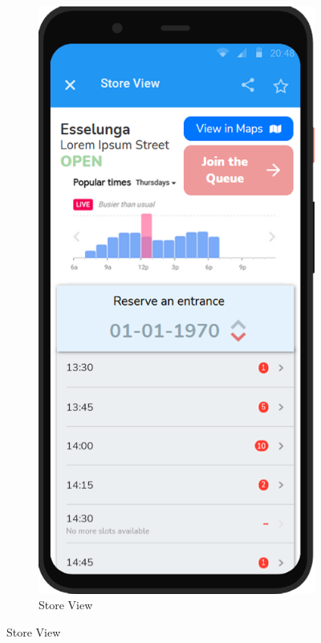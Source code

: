 \begin{figure}[H]
    \begin{subfigure}{.33\textwidth}
        \centering
        \includegraphics[width=.95\linewidth]{Images/screen_05.png}
        \caption{Store View}

\end{subfigure}
\end{figure}
